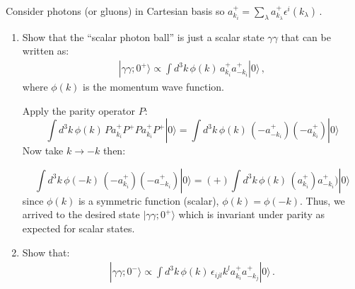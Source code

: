 Consider photons (or gluons) in Cartesian basis so $a^+_{k_{i}} = \sum_\lambda a^+_{k_{\lambda}} \epsilon^i (k_{\lambda})$\,.
\begin{enumerate}
      \item Show that the ``scalar photon ball'' is just a scalar state $\gamma\gamma$ that can be written as:
            \begin{align}
                  | \gamma\gamma; 0^+ \rangle \propto \int d^3 k \, \phi(k) \, a^+_{k_{i}}a^+_{-k_{i}}| 0 \rangle\,,
            \end{align}
            where $\phi(k)$ is the momentum wave function.

            \begin{solution}
                  Apply the parity operator $P$:
                  $$ \int d^3 k \, \phi(k) \,P a^+_{k_i} P^+P a^+_{k_i} P^+| 0 \rangle = \int d^3 k \, \phi(k) \, (-a^+_{-k_i}) (-a^+_{k_i}) | 0 \rangle$$
                  Now take $k \to -k$ then:

                  $$\int d^3 k \, \phi(-k) \, (-a^+_{k_i}) (-a^+_{-k_i}) | 0 \rangle=(\mathbf{+})\int d^3 k \, \phi(k) \, (a^+_{k_i})a^+_{-k_i}) | 0 \rangle$$
                  since $ \phi(k)$ is a symmetric function (scalar), $\phi(k) = \phi(-k)$.
                  Thus, we arrived to the desired state $ | \gamma\gamma; 0^+ \rangle$ which is invariant under parity as expected for scalar states.
            \end{solution}

      \item Show that:
            \begin{align}
                  | \gamma\gamma; 0^- \rangle \propto \int d^3 k \, \phi(k) \,\epsilon_{ijl} k^l a^+_{k_{i}}a^+_{-k_{j}}| 0 \rangle\,.
            \end{align}


\end{enumerate}

